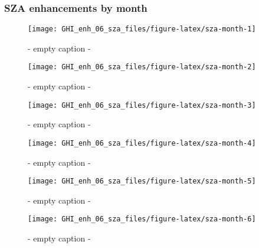 \documentclass[
  10pt,
  a4paper,oneside]{article}
\begin{document}
\newpage
\FloatBarrier

\hypertarget{sza-enhancements-by-month}{%
\subsubsection{SZA enhancements by month}\label{sza-enhancements-by-month}}

\begin{figure}[H]

{\centering \texttt{[image: GHI\_enh\_06\_sza\_files/figure-latex/sza-month-1]} 

}

\caption{ - empty caption - }\label{fig:sza-month-1}
\end{figure}
\begin{figure}[H]

{\centering \texttt{[image: GHI\_enh\_06\_sza\_files/figure-latex/sza-month-2]} 

}

\caption{ - empty caption - }\label{fig:sza-month-2}
\end{figure}
\begin{figure}[H]

{\centering \texttt{[image: GHI\_enh\_06\_sza\_files/figure-latex/sza-month-3]} 

}

\caption{ - empty caption - }\label{fig:sza-month-3}
\end{figure}
\begin{figure}[H]

{\centering \texttt{[image: GHI\_enh\_06\_sza\_files/figure-latex/sza-month-4]} 

}

\caption{ - empty caption - }\label{fig:sza-month-4}
\end{figure}
\begin{figure}[H]

{\centering \texttt{[image: GHI\_enh\_06\_sza\_files/figure-latex/sza-month-5]} 

}

\caption{ - empty caption - }\label{fig:sza-month-5}
\end{figure}
\begin{figure}[H]

{\centering \texttt{[image: GHI\_enh\_06\_sza\_files/figure-latex/sza-month-6]} 

}

\caption{ - empty caption - }\label{fig:sza-month-6}
\end{figure}
\end{document}
